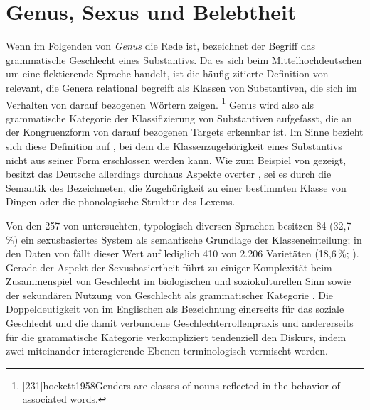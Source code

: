 
\section{Genus, Sexus und Belebtheit}
\label{sec:gendsex}


Wenn im Folgenden von \textit{Genus} die Rede ist, bezeichnet der Begriff das
grammatische Geschlecht eines Substantivs. Da es sich beim
Mittelhochdeutschen um eine flektierende Sprache handelt,
ist die häufig zitierte Definition von \citet[231]{hockett1958} relevant, die
Genera relational begreift als Klassen von Substantiven, die sich im Verhalten
von darauf bezogenen Wörtern zeigen.%
%
	\footnote{[231]{hockett1958}{Genders are classes
		of nouns reflected in the behavior of associated words}.}
%
Genus wird also als grammatische Kategorie der Klassifizierung von Substantiven
aufgefasst, die an der Kongruenzform von darauf bezogenen Targets erkennbar
ist. Im Sinne  bezieht sich diese Definition auf
, bei dem die Klassenzugehörigkeit eines
Substantivs nicht aus seiner Form erschlossen werden kann. Wie zum Beispiel von
\citet{koepckezubin2017} gezeigt, besitzt das Deutsche
allerdings durchaus Aspekte overter , sei es durch die
Semantik des Bezeichneten, die Zugehörigkeit zu einer bestimmten Klasse von
Dingen oder die phonologische Struktur des Lexems.

Von den 257 von \citet{corbett2013b} untersuchten, typologisch diversen
Sprachen besitzen 84 (32,7\,\%) ein sexusbasiertes System als semantische
Grundlage der Klasseneinteilung; in den Daten von 
\autocite{skirgardetal2023} fällt dieser Wert auf lediglich 410 von 2.206
Varietäten (18,6\,\%; \cite[siehe][]{haynie:gb051}). Gerade der Aspekt der
Sexusbasiertheit führt zu einiger Komplexität beim Zusammenspiel von Geschlecht
im biologischen und soziokulturellen Sinn sowie der
sekundären Nutzung von Geschlecht als grammatischer Kategorie \autocites[dazu
ausführlich][]{kotthoffnuebling2018}{steriopolosteriopolo2022}. Die
Doppeldeutigkeit von  im Englischen als Bezeichnung
einerseits für das soziale Geschlecht und die damit verbundene
Geschlechter\-rollen\-praxis und andererseits für die
grammatische Kategorie verkompliziert tendenziell den Diskurs, indem zwei
miteinander interagierende Ebenen terminologisch vermischt werden.

